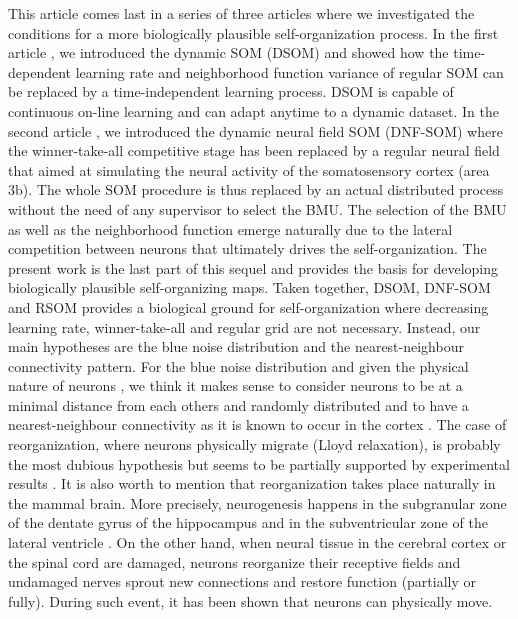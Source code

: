 This article comes last in a series of three articles where we investigated
the conditions for a more biologically plausible self-organization process. In the first article \citep{Rougier:2017}, we introduced the dynamic SOM (DSOM) and showed how the time-dependent learning rate and neighborhood function variance of regular SOM can be replaced by a time-independent learning process. DSOM is capable of continuous on-line learning and can adapt anytime to a dynamic dataset. In the second article \citep{Detorakis2012, Detorakis2014}, we introduced the dynamic neural field SOM (DNF-SOM) where the winner-take-all competitive stage has been replaced by a regular neural field that aimed at simulating the neural activity of the somatosensory cortex (area 3b). The whole SOM procedure is thus replaced by an actual distributed process without the need of any supervisor to select the BMU. The selection of the BMU as well as the neighborhood function emerge naturally
due to the lateral competition between neurons that ultimately drives the self-organization. The present work is the last part of this sequel and provides the basis for developing biologically plausible self-organizing maps. Taken together, DSOM, DNF-SOM and RSOM provides a biological ground for self-organization where decreasing learning rate, winner-take-all and regular grid are not necessary. Instead, our main hypotheses are the blue noise distribution and the nearest-neighbour connectivity pattern. For the blue noise distribution and given the physical nature of neurons \citep{BlazquezLlorca2014,Lanaro:2020}, we think it makes sense to consider neurons to be at a minimal distance from each others and randomly distributed and to have a nearest-neighbour connectivity as it is known to occur in the cortex \citep{vanPelt2013}. The case of reorganization, where neurons physically migrate (Lloyd relaxation), is probably the most dubious hypothesis but seems to be partially supported by experimental results
\citep{Kaneko2017}. It is also worth to mention that reorganization takes place naturally in the mammal brain. More precisely, neurogenesis happens in the subgranular zone of the dentate gyrus of the hippocampus and in the subventricular zone of the lateral ventricle \citep{Alvarez:2004}. On the other hand, when neural tissue in the cerebral cortex \citep{Merzenich:1984,Taub:2014} or the spinal cord \citep{Bareyre:2004,Liu:1958} are damaged, neurons reorganize their receptive fields and undamaged nerves sprout new connections and restore function (partially or fully). During such event, it has been shown that neurons can physically move.

